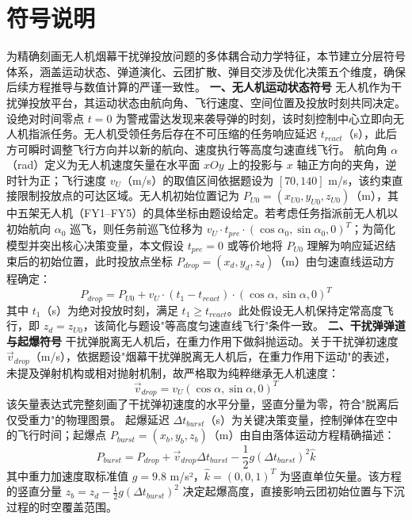 \documentclass{JXUSTmodeling}
\begin{document}
\section{符号说明}
为精确刻画无人机烟幕干扰弹投放问题的多体耦合动力学特征，本节建立分层符号体系，涵盖运动状态、弹道演化、云团扩散、弹目交涉及优化决策五个维度，确保后续方程推导与数值计算的严谨一致性。
\textbf{一、无人机运动状态符号}
无人机作为干扰弹投放平台，其运动状态由航向角、飞行速度、空间位置及投放时刻共同决定。设绝对时间零点 $t=0$ 为警戒雷达发现来袭导弹的时刻，该时刻控制中心立即向无人机指派任务。无人机受领任务后存在不可压缩的任务响应延迟 $t_{react}$（s），此后方可瞬时调整飞行方向并以新的航向、速度执行等高度匀速直线飞行。
航向角 $\alpha$（rad）定义为无人机速度矢量在水平面 $xOy$ 上的投影与 $x$ 轴正方向的夹角，逆时针为正；飞行速度 $v_U$（m/s）的取值区间依据题设为 $[70, 140]$ m/s，该约束直接限制投放点的可达区域。无人机初始位置记为 $P_{U0}=(x_{U0}, y_{U0}, z_{U0})$（m），其中五架无人机（FY1–FY5）的具体坐标由题设给定。若考虑任务指派前无人机以初始航向 $\alpha_0$ 巡飞，则任务前巡飞位移为 $v_U \cdot t_{pre} \cdot (\cos\alpha_0, \sin\alpha_0, 0)^T$；为简化模型并突出核心决策变量，本文假设 $t_{pre}=0$ 或等价地将 $P_{U0}$ 理解为响应延迟结束后的初始位置，此时投放点坐标 $P_{drop}=(x_d, y_d, z_d)$（m）由匀速直线运动方程确定：
\begin{equation}
P_{drop} = P_{U0} + v_U \cdot (t_1 - t_{react}) \cdot (\cos\alpha, \sin\alpha, 0)^T \tag{1}
\end{equation}
其中 $t_1$（s）为绝对投放时刻，满足 $t_1 \geq t_{react}$。此处假设无人机保持定常高度飞行，即 $z_d = z_{U0}$，该简化与题设"等高度匀速直线飞行"条件一致。
\textbf{二、干扰弹弹道与起爆符号}
干扰弹脱离无人机后，在重力作用下做斜抛运动。关于干扰弹初速度 $\vec{v}_{drop}$（m/s），依据题设"烟幕干扰弹脱离无人机后，在重力作用下运动"的表述，未提及弹射机构或相对抛射机制，故严格取为纯粹继承无人机速度：
\begin{equation}
\vec{v}_{drop} = v_U(\cos\alpha, \sin\alpha, 0)^T \tag{2}
\end{equation}
该矢量表达式完整刻画了干扰弹初速度的水平分量，竖直分量为零，符合"脱离后仅受重力"的物理图景。
起爆延迟 $\Delta t_{burst}$（s）为关键决策变量，控制弹体在空中的飞行时间；起爆点 $P_{burst}=(x_b, y_b, z_b)$（m）由自由落体运动方程精确描述：
\begin{equation}
P_{burst} = P_{drop} + \vec{v}_{drop}\Delta t_{burst} - \frac{1}{2}g(\Delta t_{burst})^2\hat{k} \tag{3}
\end{equation}
其中重力加速度取标准值 $g=9.8$ m/s²，$\hat{k}=(0,0,1)^T$ 为竖直单位矢量。该方程的竖直分量 $z_b = z_d - \frac{1}{2}g(\Delta t_{burst})^2$ 决定起爆高度，直接影响云团初始位置与下沉过程的时空覆盖范围。
\end{document}
